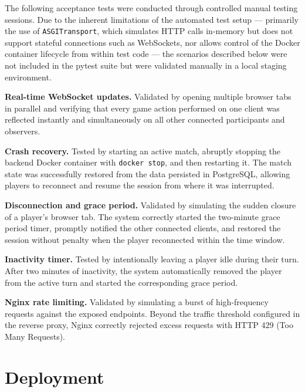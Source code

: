 \documentclass{scrartcl}
\begin{document}

The following acceptance tests were conducted through controlled manual
testing sessions. Due to the inherent limitations of the automated test
setup --- primarily the use of \texttt{ASGITransport}, which simulates
HTTP calls in-memory but does not support stateful connections such as
WebSockets, nor allows control of the Docker container lifecycle from
within test code --- the scenarios described below were not included in
the pytest suite but were validated manually in a local staging environment.

\textbf{Real-time WebSocket updates.} Validated by opening multiple browser
tabs in parallel and verifying that every game action performed on one client
was reflected instantly and simultaneously on all other connected participants
and observers.

\textbf{Crash recovery.} Tested by starting an active match, abruptly stopping
the backend Docker container with \texttt{docker stop}, and then restarting it.
The match state was successfully restored from the data persisted in PostgreSQL,
allowing players to reconnect and resume the session from where it was interrupted.

\textbf{Disconnection and grace period.} Validated by simulating the sudden
closure of a player's browser tab. The system correctly started the two-minute
grace period timer, promptly notified the other connected clients, and restored
the session without penalty when the player reconnected within the time window.

\textbf{Inactivity timer.} Tested by intentionally leaving a player idle
during their turn. After two minutes of inactivity, the system automatically
removed the player from the active turn and started the corresponding grace
period.

\textbf{Nginx rate limiting.} Validated by simulating a burst of high-frequency
requests against the exposed endpoints. Beyond the traffic threshold configured
in the reverse proxy, Nginx correctly rejected excess requests with
HTTP 429 (Too Many Requests).

\section{Deployment}\label{deployment}
\end{document}
